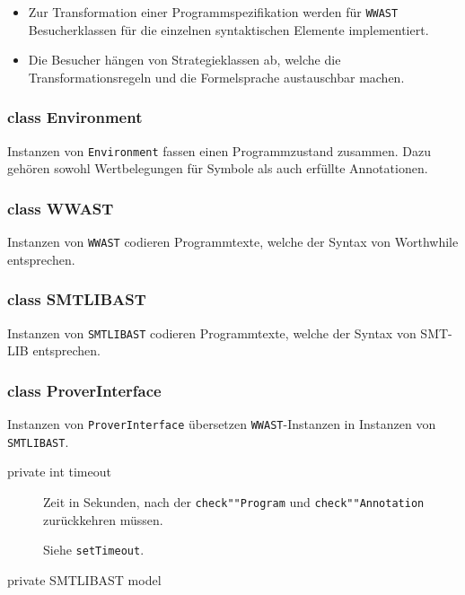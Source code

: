 \begin{itemize}%

    \item Zur Transformation einer Programmspezifikation werden für
    \texttt{WWAST} Besucherklassen für die einzelnen syntaktischen
    Elemente implementiert.%

    \item Die Besucher hängen von Strategieklassen ab, welche die
    Transformationsregeln und die Formelsprache austauschbar machen.%


\end{itemize}%

\subsubsection{class Environment}%

Instanzen von \texttt{Environment} fassen einen Programmzustand
zusammen. Dazu gehören sowohl Wertbelegungen für Symbole als auch
erfüllte Annotationen.%

\subsubsection{class WWAST}%

Instanzen von \texttt{WWAST} codieren Programmtexte, welche der Syntax
von Worthwhile entsprechen.%

\subsubsection{class SMTLIBAST}%

Instanzen von \texttt{SMTLIBAST} codieren Programmtexte, welche der
Syntax von SMT-LIB entsprechen.%

\subsubsection{class ProverInterface}%

Instanzen von \texttt{ProverInterface} übersetzen
\texttt{WWAST}-Instanzen in Instanzen von \texttt{SMTLIBAST}.%


\begin{description}%
    \item [private int timeout]

    Zeit in Sekunden, nach der \texttt{check""Program} und
    \texttt{check""Annotation} zurückkehren müssen.%

    Siehe \texttt{setTimeout}.%

    \item [private SMTLIBAST model]%

\end{description}%

